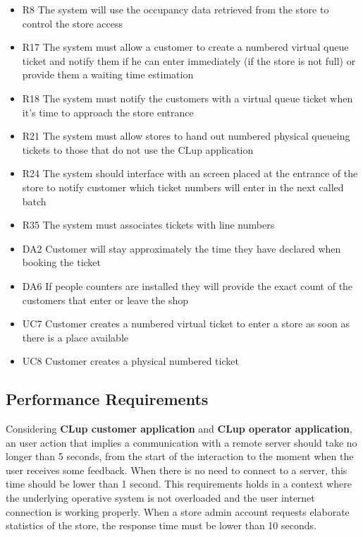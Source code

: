 \begin{itemize}
    \begin{itemize}
        \item R8 The system will use the occupancy data retrieved from the store to control the store access
        \item R17 The system must allow a customer to create a numbered virtual queue ticket and notify them if he can enter immediately (if the store is not full) or provide them a waiting time estimation
        \item R18 The system must notify the customers with a virtual queue ticket when it’s time to approach the store entrance
        \item R21 The system must allow stores to hand out numbered physical queueing tickets to those that do not use the CLup application
        \item R24 The system should interface with an screen placed at the entrance of the store to notify customer which ticket numbers will enter in the next called batch
        \item R35 The system must associates tickets with line numbers
        \medskip
        \item DA2 Customer will stay approximately the time they have declared when booking the ticket
        \item DA6 If people counters are installed they will provide the exact count of the customers that enter or leave the shop
        \medskip
        \item UC7 Customer creates a numbered virtual ticket to enter a store as soon as there is a place available
        \item UC8 Customer creates a physical numbered ticket
    \end{itemize}
\end{itemize}


\subsection{Performance Requirements}
Considering \textbf{CLup customer application} and \textbf{CLup operator application}, an user action that implies a communication with a remote server should take no longer than 5 seconds, from the start of the interaction to the moment when the user receives some feedback. When there is no need to connect to a server, this time should be lower than 1 second. This requirements holds in a context where the underlying operative system is not overloaded and the user internet connection is working properly.
\smallskip
When a store admin account requests elaborate statistics of the store, the response time must be lower than 10 seconds.
